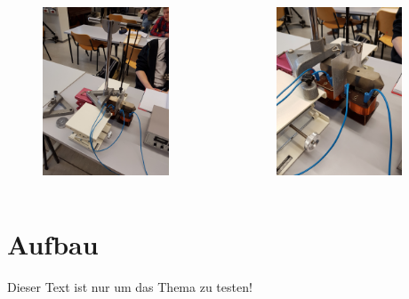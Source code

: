   \begin{frame}

      \begin{columns}[onlytextwidth]
        \begin{column}{0.45\textwidth}
          \begin{figure}
            \centering
              \includegraphics[height=5cm, angle = -90]{20170306_101228.jpg}
          \end{figure}
        \end{column}
        \begin{column}{0.45\textwidth}
          \begin{figure}
            \centering
              \includegraphics[height=5cm, angle = -90]{20170306_101230.jpg}
          \end{figure}
        \end{column}
      \end{columns}

  \end{frame}

  \section{Aufbau}

  \begin{frame}
    Dieser Text ist nur um das Thema zu testen!
  \end{frame}

